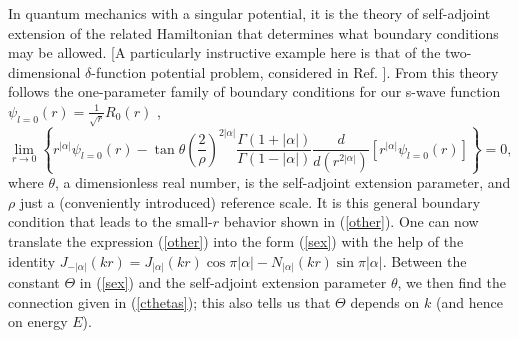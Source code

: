 \documentclass[a4paper,aps,eqsecnum,preprint,preprintnumbers,12pt]{revtex4}
\begin{document}
In quantum mechanics with a singular potential, it is the theory
of self-adjoint extension of the related Hamiltonian that
determines what boundary conditions may be allowed. [A
particularly instructive example here is that of the
two-dimensional $\delta$-function potential problem, considered in
Ref. \cite{jackiw}]. From this theory follows the one-parameter
family of boundary conditions for our s-wave function
$\psi_{l=0}(r) = \displaystyle \frac{1}{\sqrt{r}} R_{0}(r)$
\cite{albeverio},
\begin{equation}
\lim_{r \rightarrow 0} \left\{ r^{|\alpha|} \psi_{l=0}(r) -
\tan\theta \left( \frac{2}{\rho} \right)^{2|\alpha|} \frac{
\Gamma(1+|\alpha|) }{ \Gamma(1-|\alpha|) }
\frac{d}{d(r^{2|\alpha|})} [ r^{|\alpha|} \psi_{l=0}(r) ] \right\}
= 0,
\end{equation}
where $\theta$, a dimensionless real number, is the self-adjoint
extension parameter, and $\rho$ just a (conveniently introduced)
reference scale. It is this general boundary condition that leads
to the small-$r$ behavior shown in (\ref{other}). One can now
translate the expression (\ref{other}) into the form (\ref{sex})
with the help of the identity $J_{-|\alpha|}(kr) =
J_{|\alpha|}(kr) \cos\pi|\alpha| - N_{|\alpha|}(kr)
\sin\pi|\alpha|$. Between the constant $\Theta$ in (\ref{sex}) and
the self-adjoint extension parameter $\theta$, we then find the
connection given in (\ref{cthetas}); this also tells us that
$\Theta$ depends on $k$ (and hence on energy $E$).
\end{document}
